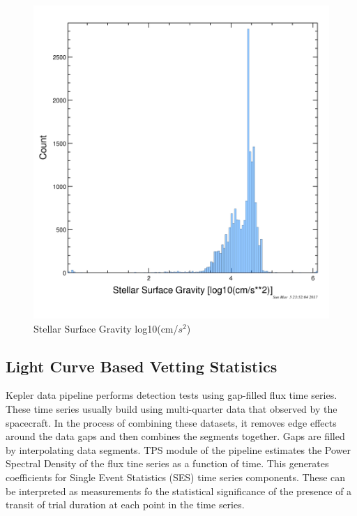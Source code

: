 \begin{figure}[!h]
\begin{center}
        \includegraphics[width=0.5\textheight]{img/stellargravity.png}
        \caption{ Stellar Surface Gravity log10(cm/$s^{2}$)}  \label{plot:stellargravity}
\end{center}
\end{figure}

\subsection{Light Curve Based Vetting Statistics}
Kepler data pipeline performs detection tests using gap-filled flux time series. These time series usually build using multi-quarter data that observed by the spacecraft. In the process of combining these datasets, it removes edge effects around the data gaps and then combines the segments together. Gaps are filled by interpolating data segments.  TPS module of the pipeline estimates the Power Spectral Density of the flux tine series as a function of time. This generates coefficients for Single Event Statistics (SES) time series components. These can be interpreted as measurements fo the statistical significance of the presence of a transit of trial duration at each point in the time series. 

